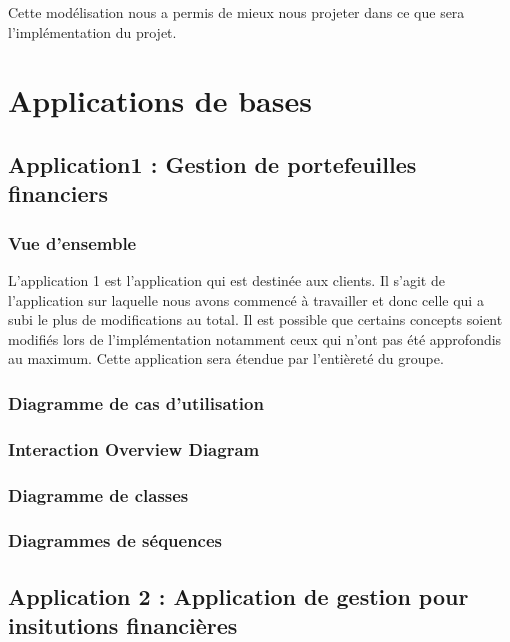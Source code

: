 \documentclass{article}
\begin{document}
		\bigskip

		Cette modélisation nous a permis de mieux nous projeter dans ce que sera l'implémentation du projet.
\section{Applications de bases}

	\subsection{Application1 : Gestion de portefeuilles financiers}

		\subsubsection{Vue d'ensemble}
			L'application 1 est l'application qui est destinée aux clients. Il s'agit de l'application sur
			laquelle nous avons commencé à travailler et donc celle qui a subi le plus de modifications au total.
			Il est possible que certains concepts soient modifiés lors de l'implémentation notamment ceux qui 
			n'ont pas été approfondis au maximum. Cette application sera étendue par l'entièreté du groupe.
		\newpage
		\subsubsection{Diagramme de cas d'utilisation}
				
				
		\subsubsection{Interaction Overview Diagram}
		
				
		
		\subsubsection{Diagramme de classes}
				
		\newpage
		\subsubsection{Diagrammes de séquences}

                
		
	\subsection{Application 2 : Application de gestion pour insitutions financières}
\end{document}
